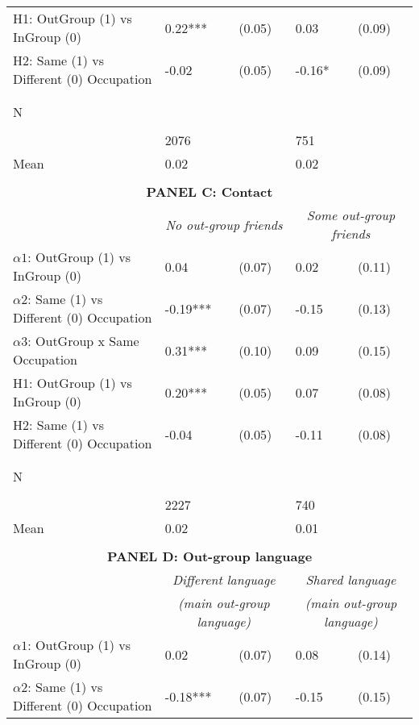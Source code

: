 \begin{tabular}{l*{4}{l}}
H1: OutGroup (1) vs InGroup (0)&     0.22***&   (0.05)&     0.03   &   (0.09)\\
 
H2: Same (1) vs Different (0) Occupation&    -0.02   &   (0.05)&    -0.16*  &   (0.09)\\
 
  \\\\[-0.5cm] N \\\\[-0.6cm]&     2076   &         &      751   &         \\
Mean            &     0.02&         &     0.02&         \\
 
 \\ \midrule \multicolumn{5}{c}{\textbf{PANEL C: Contact}} \\ & \multicolumn{2}{c}{\textit{No out-group friends}} & \multicolumn{2}{c}{\textit{Some out-group friends}}   \\  \midrule  
$\alpha1$: OutGroup (1) vs InGroup (0)&     0.04   &   (0.07)&     0.02   &   (0.11)\\
$\alpha2$: Same (1) vs Different (0) Occupation&    -0.19***&   (0.07)&    -0.15   &   (0.13)\\
 
$\alpha3$: OutGroup x Same Occupation&     0.31***&   (0.10)&     0.09   &   (0.15)\\
 
H1: OutGroup (1) vs InGroup (0)&     0.20***&   (0.05)&     0.07   &   (0.08)\\
 
H2: Same (1) vs Different (0) Occupation&    -0.04   &   (0.05)&    -0.11   &   (0.08)\\
 
  \\\\[-0.5cm] N \\\\[-0.6cm]&     2227   &         &      740   &         \\
Mean            &     0.02&         &     0.01&         \\
 
 \\ \midrule \multicolumn{5}{c}{\textbf{PANEL D: Out-group language}} \\ & \multicolumn{2}{c}{\textit{Different language}} & \multicolumn{2}{c}{\textit{Shared language}}   \\  & \multicolumn{2}{c}{\textit{(main out-group language)}} & \multicolumn{2}{c}{\textit{(main out-group language)}}  \\ \midrule  
$\alpha1$: OutGroup (1) vs InGroup (0)&     0.02   &   (0.07)&     0.08   &   (0.14)\\
$\alpha2$: Same (1) vs Different (0) Occupation&    -0.18***&   (0.07)&    -0.15   &   (0.15)\\
 

\end{tabular}
